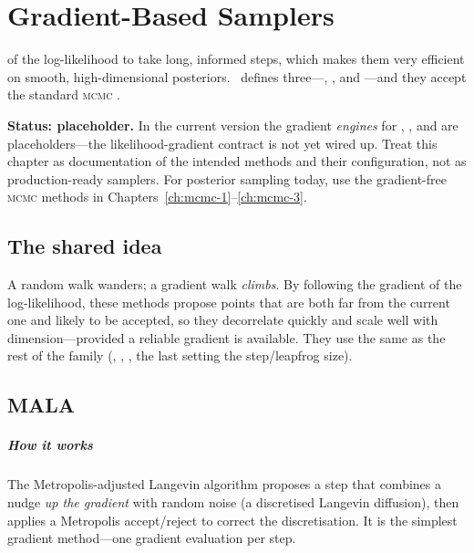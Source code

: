 \chapter{Gradient-Based Samplers}
\label{ch:gradient}

 of the log-likelihood to take long, informed
steps, which makes them very efficient on smooth, high-dimensional posteriors. \Jarvis\ defines
three---, , and ---and they accept the standard
\textsc{mcmc} .

\begin{jwarn}
\textbf{Status: placeholder.} In the current version the gradient \emph{engines} for
, , and  are placeholders---the likelihood-gradient
contract is not yet wired up. Treat this chapter as documentation of the intended methods and their
configuration, not as production-ready samplers. For posterior sampling today, use the
gradient-free \textsc{mcmc} methods in Chapters~\ref{ch:mcmc-1}--\ref{ch:mcmc-3}.
\end{jwarn}

\section{The shared idea}
\label{sec:grad-idea}

A random walk wanders; a gradient walk \emph{climbs}. By following the gradient of the
log-likelihood, these methods propose points that are both far from the current one and likely to
be accepted, so they decorrelate quickly and scale well with dimension---provided a reliable
gradient is available. They use the same  as the rest of the family
(, , , the last setting the
step/leapfrog size).

\section{MALA}
\label{sec:s-mala}

\paragraph{How it works} The Metropolis-adjusted Langevin algorithm proposes a step that combines a
nudge \emph{up the gradient} with random noise (a discretised Langevin diffusion), then applies a
Metropolis accept/reject to correct the discretisation. It is the simplest gradient method---one
gradient evaluation per step.

